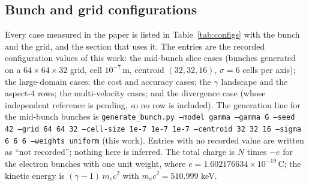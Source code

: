 \subsection{Bunch and grid configurations}
\label{sec:configs}

Every case measured in the paper is listed in
Table~\ref{tab:configs} with the bunch and the grid, and the section that
uses it. The entries are the recorded configuration values of this work: the
mid-bunch slice cases (bunches generated on a
$64\times64\times32$ grid, cell $10^{-7}$\,m, centroid $(32,32,16)$,
$\sigma=6$ cells per axis); the large-domain cases; the cost and
accuracy cases; the $\gamma$ landscape and the aspect-4 rows; the
multi-velocity cases; and the divergence case (whose independent reference is
pending, so no row is included). The generation line for the mid-bunch
bunches is
\texttt{generate\_bunch.py --model gamma --gamma G --seed 42 --grid 64 64 32
--cell-size 1e-7 1e-7 1e-7 --centroid 32 32 16 --sigma 6 6 6 --weights
uniform} (this work). Entries with no recorded value are written as
``not recorded''; nothing here is inferred. The total charge is $N$ times
$-e$ for the electron bunches with one unit weight, where $e =
1.602176634\times10^{-19}$\,C; the kinetic energy is
$(\gamma-1)\,m_ec^2$ with $m_ec^2 = 510.999$ keV.

